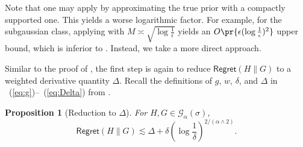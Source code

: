 \documentclass[letterpaper,11pt]{article}
\newcommand{\eqref}[1]{~(\ref{#1})}
\newcommand{\pth}[1]{\left( #1 \right)}
\newtheorem{prop}[theorem]{Proposition}
\theoremstyle{definition}
\newcommand{\Regret}{\mathsf{Regret}}
\begin{document}
Note that one may apply  by approximating the true
prior with a compactly supported one.  This yields a worse logarithmic factor. For
example, for the subgaussian class, applying
 with $M \asymp \sqrt{\log \frac{1}{\epsilon}}$ yields an
$O\pr{\epsilon (\log \frac{1}{\epsilon})^2}$ upper bound, which is inferior to
. Instead, we take a more direct approach.

    Similar to the proof of , the first step is again to reduce  $\Regret(H\|G)$ to a weighted derivative quantity $\Delta$.
    Recall the definitions of $g$, $w$, $\delta$, and $\Delta$ in
    \eqref{eq:g}--\eqref{eq:Delta} from .

    \begin{prop}[Reduction to $\Delta$]
      \label{prop:exp-delta-reduction}
      For $H,G \in \mathcal{G}_\alpha(\sigma)$,
      \[
        \Regret(H\|G)
        \lesssim
        \Delta
        +
        \delta \pth{\log \frac{1}{\delta}}^{2/(\alpha\wedge 2)}.
      \]
    \end{prop}
\end{document}
